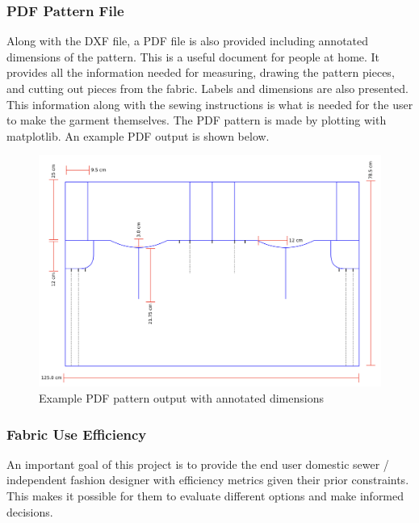 \subsubsection{PDF Pattern File}
Along with the DXF file, a PDF file is also provided including annotated dimensions of the pattern. This is a useful document for people at home. It provides all the information needed for measuring, drawing the pattern pieces, and cutting out pieces from the fabric. Labels and dimensions are also presented. This information along with the sewing instructions is what is needed for the user to make the garment themselves. The PDF pattern is made by plotting with matplotlib. An example PDF output is shown below.
\begin{figure} [H] %
    \centering %
    \includegraphics[width = \textwidth]{Images/example pdf output.png} %
    \caption{Example PDF pattern output with annotated dimensions}
    \label{} %
\end{figure}


\subsubsection{Fabric Use Efficiency}
An important goal of this project is to provide the end user domestic sewer / independent fashion designer with efficiency metrics given their prior constraints. This makes it possible for them to evaluate different options and make informed decisions.

